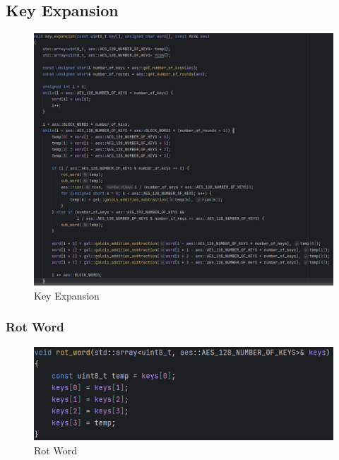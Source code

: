 
\subsection{Key Expansion}

\begin{figure}[H]
	\centering
	\includegraphics[width=1\textwidth, height=1\textheight, keepaspectratio]{./images/code/cpp/key_expansion/key_expansion.PNG}
	\caption{Key Expansion}
	\label{fig:key_expansion_code}
\end{figure}

\textsf{\small } %

\subsubsection{Rot Word}

\begin{figure}[H]
	\centering
	\includegraphics[width=1\textwidth, height=1\textheight, keepaspectratio]{./images/code/cpp/key_expansion/rot_word.PNG}
	\caption{Rot Word}
	\label{fig:rot_word}
\end{figure}

